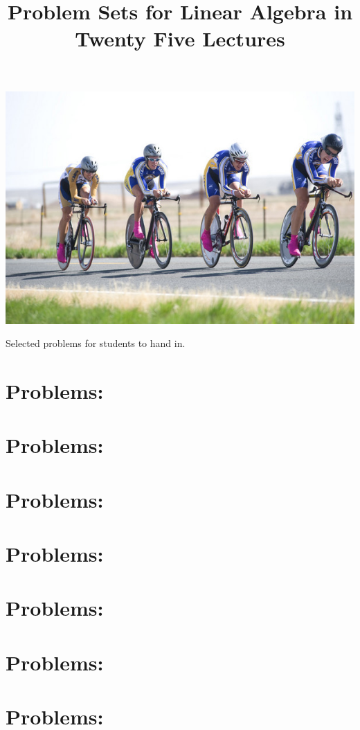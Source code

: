\documentclass[10pt]{article}
\newcommand{\1}{{\rm 1\hspace*{-0.4ex}%
\rule{0.1ex}{1.52ex}\hspace*{0.2ex}}}
\newcommand{\problemtitle}[1]{\section{Problems: #1}}
\newcommand{\probleminput}[1]{}
\begin{document}
\pagestyle{plain}

\title{Problem Sets for Linear Algebra in Twenty Five Lectures}




\maketitle

\begin{center}
\includegraphics[scale=.6]{bikes.jpg}\\[8mm]
\end{center}

\begin{center}
Selected  problems for students to hand in.
\end{center}

\newpage

\tableofcontents

\newpage

\problemtitle{\whatIsTitle}
\probleminput{\whatIsPath/problems}

\problemtitle{\gaussElimTitle}
\probleminput{\gaussElimPath/problems}

\problemtitle{\elemRowOpsTitle}
\probleminput{\elemRowOpsPath/problems}

\problemtitle{\solutionSetsTitle}
\probleminput{\solutionSetsPath/problems}

\problemtitle{\vectorsInSpaceTitle}
\probleminput{\vectorsInSpacePath/problems}

\problemtitle{\vectorSpacesTitle}
\probleminput{\vectorSpacesPath/problems}

\problemtitle{\linTransTitle}
\probleminput{\linTransPath/problems}
\end{document}
